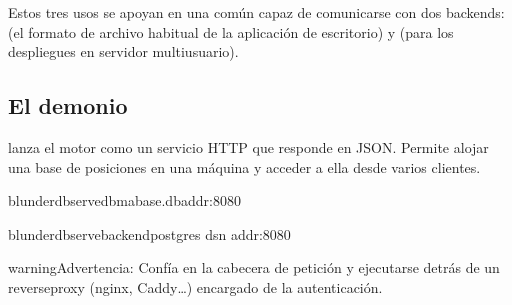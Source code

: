 \documentclass[letterpaper,10pt,spanish]{sphinxmanual}
\begin{document}
\sphinxAtStartPar
Estos tres usos se apoyan en una  común capaz de comunicarse con dos backends:  (el formato de archivo  habitual de la aplicación de escritorio) y  (para los despliegues en servidor multiusuario).


\subsection{El demonio }
\label{\detokenize{mode_headless:le-demon-serve}}\label{\detokenize{mode_headless:headless-serve}}
\sphinxAtStartPar
{} lanza el motor como un servicio HTTP que responde en JSON. Permite alojar una base de posiciones en una máquina y acceder a ella desde varios clientes.

\begin{sphinxVerbatim}[commandchars=\\\{\}]
blunderdbserve\PYGZhy{}\PYGZhy{}dbma\PYGZus{}base.db\PYGZhy{}\PYGZhy{}addr:8080

blunderdbserve\PYGZhy{}\PYGZhy{}backendpostgres
\PYGZhy{}\PYGZhy{}dsn
\PYGZhy{}\PYGZhy{}addr:8080
\end{sphinxVerbatim}

\begin{sphinxadmonition}{warning}{Advertencia:}
\sphinxAtStartPar
{} Confía en la cabecera de petición  y  ejecutarse detrás de un reverse\sphinxhyphen{}proxy (nginx, Caddy…) encargado de la autenticación. 
\end{sphinxadmonition}

\sphinxAtStartPar
{}
\end{document}
